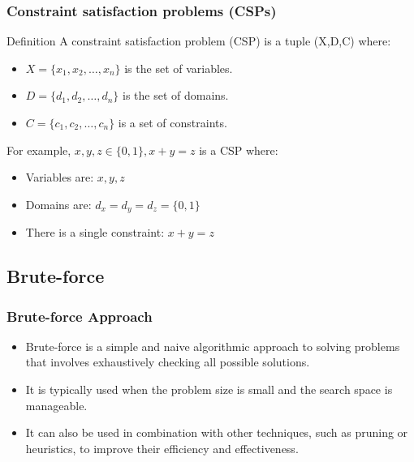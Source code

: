 \documentclass[
	11pt,
]{beamer}
\begin{document}
\begin{frame}
    \frametitle{Constraint satisfaction problems (CSPs)}

    \begin{block}{Definition}
        A constraint satisfaction problem (CSP) is a tuple (X,D,C) where:
        \begin{itemize}
            \item $X=\{x_1,x_2,…,x_n\}$ is the set of variables.
            \item $D=\{d_1,d_2,…,d_n\}$ is the set of domains.
            \item $C=\{c_1,c_2,…,c_n\}$ is a set of constraints.
        \end{itemize}
    \end{block}
    \bigskip
    For example, $x,y,z \in \{0,1\}, x + y = z$ is a CSP where:
    \begin{itemize}
        \item Variables are: $x,y,z$
        \item Domains are: $d_x = d_y = d_z = \{0,1\}$
        \item There is a single constraint: $x + y = z$
    \end{itemize}
\end{frame}

\subsection{Brute-force}
\begin{frame}
	\frametitle{Brute-force Approach}
	\begin{itemize}
		\item Brute-force is a simple and naive algorithmic approach to solving problems that involves exhaustively checking all possible solutions. 
	\bigskip
		\item It is typically used when the problem size is small and the search space is manageable.
	\bigskip
        \item It can also be used in combination with other techniques, such as pruning or heuristics, to improve their efficiency and effectiveness.
    \bigskip
\end{itemize}
\end{frame}
\end{document}
